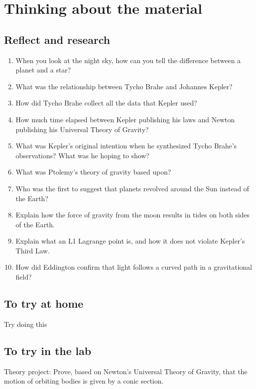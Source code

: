 \newpage
\section{Thinking about the material}
\subsection{Reflect and research}

\begin{enumerate}
\item When you look at the night sky, how can you tell the difference between a planet and a star?
\item What was the relationship between Tycho Brahe and Johannes Kepler?
\item How did Tycho Brahe collect all the data that Kepler used?
\item How much time elapsed between Kepler publishing his laws and Newton publishing his Universal Theory of Gravity?
\item What was Kepler's original intention when he synthesized Tycho Brahe's observations? What was he hoping to show?
\item What was Ptolemy's theory of gravity based upon?
\item Who was the first to suggest that planets revolved around the Sun instead of the Earth?
\item Explain how the force of gravity from the moon results in tides on both sides of the Earth.
\item Explain what an L1 Lagrange point is, and how it does not violate Kepler's Third Law.
\item How did Eddington confirm that light follows a curved path in a gravitational field?
\end{enumerate}
\subsection{To try at home}

\begin{tQuestion}Try doing this \end{tQuestion}

\subsection{To try in the lab}
Theory project: Prove, based on Newton's Universal Theory of Gravity, that the motion of orbiting bodies is given by a conic section. 

